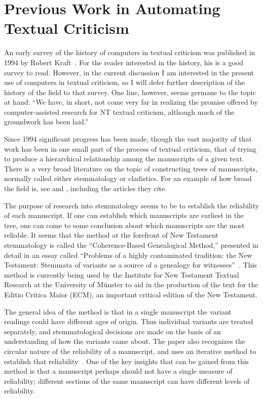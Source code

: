 \documentclass[onecolumn, 12pt]{article}
\begin{document}
\section{Previous Work in Automating Textual Criticism}
\label{sec:previous-work}

An early survey of the history of computers in textual criticism was published
in 1994 by Robert
Kraft~\cite{kraft-1994-computers-in-new-testament-textual-criticism}.  For the
reader interested in the history, his is a good survey to read.  However, in
the current discussion I am interested in the present use of computers in
textual criticism, so I will defer further description of the history of the
field to that survey.  One line, however, seems germane to the topic at hand:
``We have, in short, not come very far in realizing the promise offered by
computer-assisted research for NT textual criticism, although much of the
groundwork has been laid.''

Since 1994 significant progress has been made, though the vast majority of that
work has been in one small part of the process of textual criticism, that of
trying to produce a hierarchical relationship among the manuscripts of a given
text.  There is a very broad literature on the topic of constructing trees of
manuscripts, normally called either stemmatology or cladistics.  For an example
of how broad the field is, see \cite{spencer-2002-exploring-textual-genealogy}
and \cite{van-reenen-2004-studies-in-stemmatology-ii}, including the articles
they cite.

The purpose of research into stemmatology seems to be to establish the
reliability of each manuscript.  If one can establish which manuscripts are
earliest in the tree, one can come to some conclusion about which manuscripts
are the most reliable.  It seems that the method at the forefront of New
Testament stemmatology is called the ``Coherence-Based Genealogical Method,''
presented in detail in an essay called ``Problems of a highly contaminated
tradition: the New Testament: Stemmata of variants as a source of a genealogy
for witnesses''~\cite[pp. 13--87]{van-reenen-2004-studies-in-stemmatology-ii}.
This method is currently being used by the Institute for New Testament Textual
Research at the University of M\"{u}nster to aid in the production of the text
for the Editio Critica Maior (ECM), an important critical edition of the New
Testament.

The general idea of the method is that in a single manuscript the variant
readings could have different ages of origin.  Thus individual variants are
treated separately, and stemmatological decisions are made on the basis of an
understanding of how the variants came about.  The paper also recognizes the
circular nature of the reliability of a manuscript, and uses an iterative
method to establish that reliability~\cite[p.
25]{van-reenen-2004-studies-in-stemmatology-ii}.  One of the key insights that
can be gained from this method is that a manuscript perhaps should not have a
single measure of reliability; different sections of the same manuscript can
have different levels of reliability.
\end{document}
